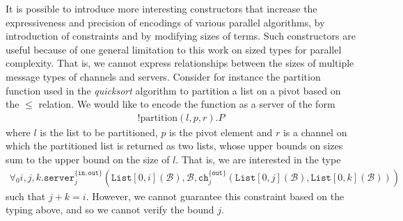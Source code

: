 It is possible to introduce more interesting constructors that increase the expressiveness and precision of encodings of various parallel algorithms, by introduction of constraints and by modifying sizes of terms. Such constructors are useful because of one general limitation to this work on sized types for parallel complexity. That is, we cannot express relationships between the sizes of multiple message types of channels and servers. Consider for instance the partition function used in the \textit{quicksort} algorithm to partition a list on a pivot based on the $\leq$ relation. We would like to encode the function as a server of the form
\begin{align*}
    !\text{partition}(l,p,r).P
\end{align*}
where $l$ is the list to be partitioned, $p$ is the pivot element and $r$ is a channel on which the partitioned list is returned as two lists, whose upper bounds on sizes sum to the upper bound on the size of $l$. That is, we are interested in the type
\begin{align*}
    \forall_0{i,j,k}.\texttt{server}^{\{\texttt{in},\texttt{out}\}}_{j}(\texttt{List}[0,i](\mathcal{B}),\mathcal{B},\texttt{ch}^{\{\texttt{out}\}}_j(\texttt{List}[0,j](\mathcal{B}),\texttt{List}[0,k](\mathcal{B})))
\end{align*}
such that $j+k=i$. However, we cannot guarantee this constraint based on the typing above, and so we cannot verify the bound $j$. 